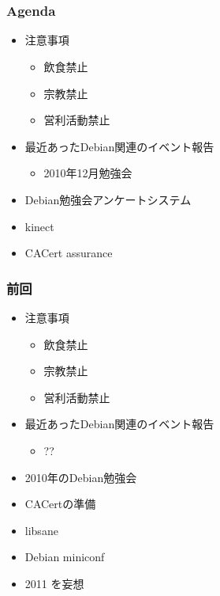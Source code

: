 \frame{\titlepage{}}

\section{}
\begin{frame}
 \frametitle{Agenda}
\begin{minipage}[t]{0.45\hsize}
  \begin{itemize}
  \item 注意事項
	\begin{itemize}
	 \item 飲食禁止
	 \item 宗教禁止
	 \item 営利活動禁止
	\end{itemize}
  \item 最近あったDebian関連のイベント報告
	\begin{itemize}
	 \item 2010年12月勉強会
	\end{itemize}
 \end{itemize}
\end{minipage} 
\begin{minipage}[t]{0.45\hsize}
 \begin{itemize}
  \item Debian勉強会アンケートシステム
  \item kinect
  \item CACert assurance
 \end{itemize}
\end{minipage}
\end{frame}

\begin{frame}
 \frametitle{前回}
\begin{minipage}[t]{0.45\hsize}
  \begin{itemize}
  \item 注意事項
	\begin{itemize}
	 \item 飲食禁止
	 \item 宗教禁止
	 \item 営利活動禁止
	\end{itemize}
  \item 最近あったDebian関連のイベント報告
	\begin{itemize}
	 \item ??
	\end{itemize}
 \end{itemize}
\end{minipage} 
\begin{minipage}[t]{0.45\hsize}
 \begin{itemize}
  \item 2010年のDebian勉強会
  \item CACertの準備
  \item libsane
  \item Debian miniconf
  \item 2011 を妄想
 \end{itemize}
\end{minipage}
\end{frame}


